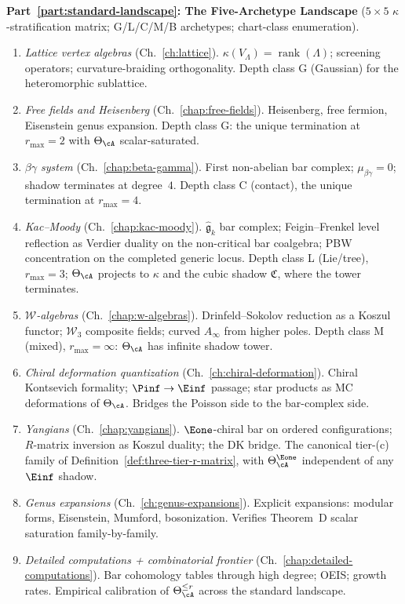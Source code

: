 \textbf{Part~\ref{part:standard-landscape}: The Five-Archetype Landscape} ($5{\times}5$ $\kappa$-stratification matrix; G/L/C/M/B archetypes; chart-class enumeration).
\begin{enumerate}[label=\textup{\arabic*.}, start=16]
\item \emph{Lattice vertex algebras} (Ch.~\ref{ch:lattice}).
 $\kappa(V_\Lambda) = \operatorname{rank}(\Lambda)$; screening
 operators; curvature-braiding orthogonality. Depth class G
 (Gaussian) for the heteromorphic sublattice.

\item \emph{Free fields and Heisenberg} (Ch.~\ref{chap:free-fields}).
 Heisenberg, free fermion, Eisenstein genus expansion. Depth class
 G: the unique termination at $r_{\max} = 2$ with
 $\Theta_\cA$ scalar-saturated.

\item \emph{$\beta\gamma$ system} (Ch.~\ref{chap:beta-gamma}).
 First non-abelian bar complex; $\mu_{\beta\gamma} = 0$; shadow
 terminates at degree~$4$. Depth class C (contact), the unique
 termination at $r_{\max} = 4$.

\item \emph{Kac--Moody} (Ch.~\ref{chap:kac-moody}).
 $\widehat{\mathfrak{g}}_k$ bar complex; Feigin--Frenkel level
 reflection as Verdier duality on the non-critical bar coalgebra;
 PBW concentration on the completed generic locus. Depth class L
 (Lie/tree),
 $r_{\max} = 3$; $\Theta_\cA$ projects to $\kappa$ and the cubic
 shadow $\mathfrak C$, where the tower terminates.

\item \emph{$\mathcal W$-algebras} (Ch.~\ref{chap:w-algebras}).
 Drinfeld--Sokolov reduction as a Koszul functor; $\mathcal{W}_3$
 composite fields; curved $A_\infty$ from higher poles. Depth class
 M (mixed), $r_{\max} = \infty$: $\Theta_\cA$ has infinite shadow
 tower.

\item \emph{Chiral deformation quantization}
 (Ch.~\ref{ch:chiral-deformation}).
 Chiral Kontsevich formality; $\Pinf \to \Einf$ passage; star
 products as MC deformations of $\Theta_\cA$. Bridges the
 Poisson side to the bar-complex side.

\item \emph{Yangians} (Ch.~\ref{chap:yangians}).
 $\Eone$-chiral bar on ordered configurations; $R$-matrix inversion
 as Koszul duality; the DK bridge. The canonical tier-(c) family of
 Definition~\ref{def:three-tier-r-matrix}, with $\Theta_\cA^{\Eone}$
 independent of any $\Einf$ shadow.

\item \emph{Genus expansions} (Ch.~\ref{ch:genus-expansions}).
 Explicit expansions: modular forms, Eisenstein, Mumford, bosonization.
 Verifies Theorem~D scalar saturation family-by-family.

\item \emph{Detailed computations + combinatorial frontier}
 (Ch.~\ref{chap:detailed-computations}).
 Bar cohomology tables through high degree; OEIS; growth rates.
 Empirical calibration of $\Theta_\cA^{\leq r}$ across the
 standard landscape.
\end{enumerate}

